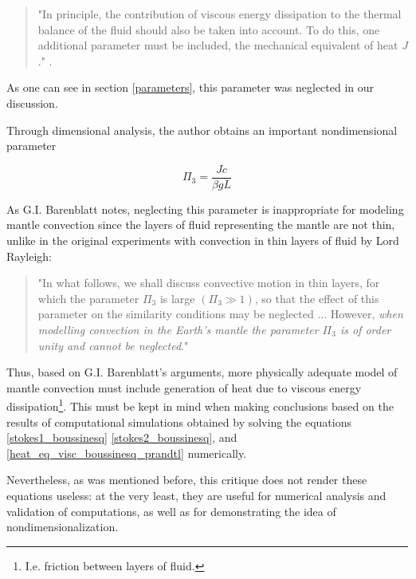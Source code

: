 \documentclass[
10pt, %
a4paper, %
oneside, %
headinclude,footinclude, %
BCOR5mm, %
]{scrartcl}
\begin{document}
\begin{quote} 

"In principle, the contribution of viscous energy dissipation to the thermal balance of the fluid should also be taken into account. To do this, one additional parameter must be included, the mechanical equivalent of heat $J$." \cite[p. 45]{barenblatt1}.

\end{quote}


As one can see in section \ref{parameters}, this parameter was neglected in our discussion.

Through dimensional analysis, the author obtains an important nondimensional parameter \cite[p. 46]{barenblatt1}

$$ \Pi_3 = \frac{Jc}{\beta g L} $$

As G.I. Barenblatt notes, neglecting this parameter is inappropriate for modeling mantle convection since the layers of fluid representing the mantle are not thin, unlike in the original experiments with convection in thin layers of fluid by Lord Rayleigh:

\begin{quote} 

"In what follows, we shall discuss convective motion in thin layers, for which the parameter $\Pi_3$ is large $(\Pi_3 \gg 1)$, so that the effect of this parameter on the similarity conditions may be neglected ... However, \emph{when modelling convection in the Earth's mantle the parameter $\Pi_3$ is of order unity and cannot be neglected}." \cite[pp. 46-47]{barenblatt1} 

\end{quote}

Thus, based on G.I. Barenblatt's arguments, more physically adequate model of mantle convection must include generation of heat due to viscous energy dissipation\footnote{I.e. friction between layers of fluid.}. This must be kept in mind when making conclusions based on the results of computational simulations obtained by solving the equations \ref{stokes1_boussinesq} \ref{stokes2_boussinesq}, and \ref{heat_eq_visc_boussinesq_prandtl} numerically. \cite[cf. p. 772 for the discussion of the importance of viscous dissipation in mantle convection]{mantle_conv_in_earth_and_planets}

Nevertheless, as was mentioned before, this critique does not render these equations useless: at the very least, they are useful for numerical analysis and validation of computations, as well as for demonstrating the idea of nondimensionalization.
\end{document}

